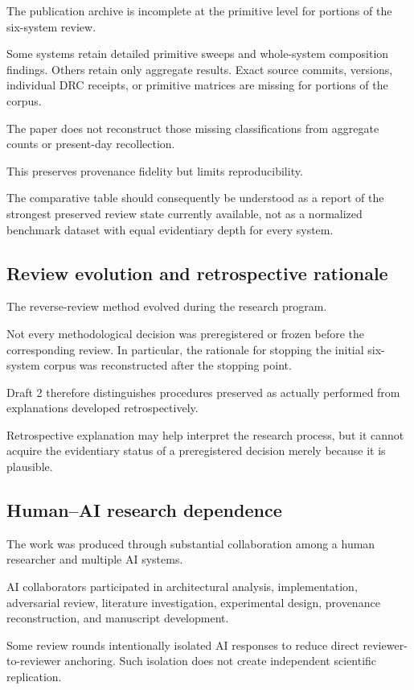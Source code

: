 \documentclass[11pt]{article}
\begin{document}
The publication archive is incomplete at the primitive level for portions of the six-system review.

Some systems retain detailed primitive sweeps and whole-system composition findings. Others retain only aggregate results. Exact source commits, versions, individual DRC receipts, or primitive matrices are missing for portions of the corpus.

The paper does not reconstruct those missing classifications from aggregate counts or present-day recollection.

This preserves provenance fidelity but limits reproducibility.

The comparative table should consequently be understood as a report of the strongest preserved review state currently available, not as a normalized benchmark dataset with equal evidentiary depth for every system.

\subsection{Review evolution and retrospective rationale}

The reverse-review method evolved during the research program.

Not every methodological decision was preregistered or frozen before the corresponding review. In particular, the rationale for stopping the initial six-system corpus was reconstructed after the stopping point.

Draft 2 therefore distinguishes procedures preserved as actually performed from explanations developed retrospectively.

Retrospective explanation may help interpret the research process, but it cannot acquire the evidentiary status of a preregistered decision merely because it is plausible.

\subsection{Human--AI research dependence}

The work was produced through substantial collaboration among a human researcher and multiple AI systems.

AI collaborators participated in architectural analysis, implementation, adversarial review, literature investigation, experimental design, provenance reconstruction, and manuscript development.

Some review rounds intentionally isolated AI responses to reduce direct reviewer-to-reviewer anchoring. Such isolation does not create independent scientific replication.
\end{document}
